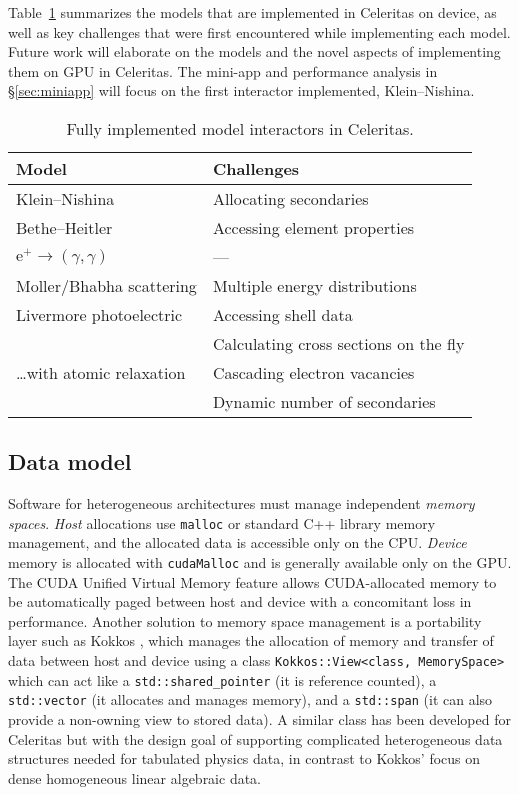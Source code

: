 Table~\ref{tab:interactor} summarizes the models that are implemented in
Celeritas on device, as well as key challenges that were first encountered while
implementing each model. Future work will elaborate on the models and the novel
aspects of implementing them on GPU in Celeritas.
The mini-app and performance analysis in \S\ref{sec:miniapp} will focus on the
first interactor implemented, Klein--Nishina.

\begin{table}[htb]
  \centering%
  \caption{Fully implemented model interactors in Celeritas.}%
  \begin{tabular}{ll}
    \toprule %
    Model & Challenges \\
    \midrule %
    Klein--Nishina & Allocating secondaries \\
    Bethe--Heitler & Accessing element properties \\
    \(\textrm{e}^+ \to (\gamma, \gamma)\) & --- \\
    Moller/Bhabha scattering & Multiple energy distributions \\
    Livermore photoelectric & Accessing shell data \\
                            & Calculating cross sections on the fly \\
    \dots with atomic relaxation & Cascading electron vacancies \\
                                 & Dynamic number of secondaries \\
    \bottomrule %
  \end{tabular}
  \label{tab:interactor}
\end{table}

\subsection{Data model}\label{data-model}

Software for heterogeneous architectures must manage independent
\emph{memory spaces}. \emph{Host} allocations use \texttt{malloc} or
standard C++ library memory management, and the allocated data is
accessible only on the CPU. \emph{Device} memory is allocated with
\texttt{cudaMalloc} and is generally available only on the GPU. The CUDA
Unified Virtual Memory feature allows CUDA-allocated memory to be
automatically paged between host and device with a concomitant loss in
performance. Another solution to memory space management is a
portability layer such as Kokkos \cite{kokkos}, which manages the
allocation of memory and transfer of data between host and device using
a class
\texttt{Kokkos::View\textless{}class,\ MemorySpace\textgreater{}} which
can act like a \texttt{std::shared\_pointer} (it is reference counted),
a \texttt{std::vector} (it allocates and manages memory), and a
\texttt{std::span} (it can also provide a non-owning view to stored
data). A similar class has been developed for Celeritas but with the
design goal of supporting complicated heterogeneous data structures needed for
tabulated physics data, in contrast to Kokkos' focus on dense homogeneous linear
algebraic data.

